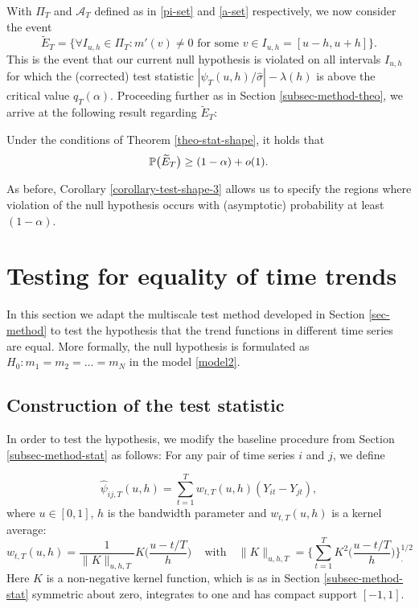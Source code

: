 \documentclass[a4paper,12pt]{article}
\numberwithin{equation}{section}
\begin{document}
With $\Pi_T$ and $\mathcal{A}_T$ defined as in \eqref{pi-set} and \eqref{a-set} respectively, we now consider the event 
\[ \widetilde{E}_T = \Big\{ \forall I_{u,h} \in \Pi_T: m'(v) \ne 0 \text{ for some } v \in I_{u,h} = [u-h,u+h] \Big\}. \]
This is the event that our current null hypothesis is violated on all intervals $I_{u,h}$ for which the (corrected) test statistic $|\widehat{\psi}_T(u,h)/\widehat{\sigma}| - \lambda(h)$ is above the critical value $q_T(\alpha)$. Proceeding further as in Section \ref{subsec-method-theo}, we arrive at the following result regarding $\widetilde{E}_T$:
\begin{corollary}\label{corollary-test-shape-3}
Under the conditions of Theorem \ref{theo-stat-shape}, it holds that  
\[ \mathbb{P} \big( \widetilde{E}_T \big) \ge (1-\alpha) + o(1). \] 
\end{corollary}

As before, Corollary \ref{corollary-test-shape-3} allows us to specify the regions where violation of the null hypothesis occurs with (asymptotic) probability at least $(1-\alpha)$.

\newpage
\section{Testing for equality of time trends}\label{sec-test-equality}

In this section we adapt the multiscale test method developed in Section \ref{sec-method} 
to test the hypothesis that the trend functions in different time series are equal. More formally, the null hypothesis is formulated as $H_0: m_1 = m_2 = \ldots = m_N$ in the model \eqref{model2}.

\subsection{Construction of the test statistic}\label{subsec-test-equality-stat}

In order to test the hypothesis, we modify the baseline procedure from Section \ref{subsec-method-stat} as follows: For any pair of time series $i$ and $j$, we define

\begin{equation}\label{kernel-ave-equality}
\widehat{\psi}_{ij,T}(u,h) = \sum\limits_{t=1}^T w_{t,T}(u,h) (Y_{it} - Y_{jt}), 
\end{equation}
where $u\in [0,1]$, $h$ is the bandwidth parameter and $w_{t,T}(u,h)$ is a kernel average: 
\[ w_{t,T}(u,h) = \frac{1}{\|K\|_{u,h,T}} K\Big( \frac{u - t/T}{h} \Big) \, \quad \text{with} \quad \|K\|_{u,h,T} = \Big\{\sum\limits_{t=1}^T  K^2\Big( \frac{u - t/T}{h} \Big)\Big\}^{1/2}_. \]
Here $K$ is a non-negative kernel function, which is as in Section \ref{subsec-method-stat} symmetric about zero, integrates to one and has compact support $[-1,1]$.
\end{document}
